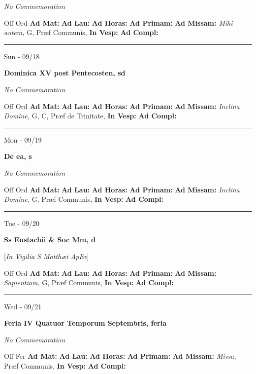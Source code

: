 \documentclass[letterpaper, 10pt]{article}
\begin{document}
\textit{No Commemoration}\begin{justify}
Off Ord
\textbf{Ad Mat: }
\textbf{Ad Lau: }
\textbf{Ad Horas: }
\textbf{Ad Primam: }
\textbf{Ad Missam:} \textit{Mihi autem, } G, Præf Communis, 
\textbf{In Vesp: }
\textbf{Ad Compl: }\end{justify}



\hrule
\begin{center}
Sun - 09/18
\end{center}\textbf{ \large Dominica XV post Pentecosten, \textnormal{\normalsize sd}}

\textit{No Commemoration}\begin{justify}
Off Ord
\textbf{Ad Mat: }
\textbf{Ad Lau: }
\textbf{Ad Horas: }
\textbf{Ad Primam: }
\textbf{Ad Missam:} \textit{Inclina Domine, } G, C, Præf de Trinitate, 
\textbf{In Vesp: }
\textbf{Ad Compl: }\end{justify}



\hrule
\begin{center}
Mon - 09/19
\end{center}\textbf{ \large De ea, \textnormal{\normalsize s}}

\textit{No Commemoration}\begin{justify}
Off Ord
\textbf{Ad Mat: }
\textbf{Ad Lau: }
\textbf{Ad Horas: }
\textbf{Ad Primam: }
\textbf{Ad Missam:} \textit{Inclina Domine, } G, Præf Communis, 
\textbf{In Vesp: }
\textbf{Ad Compl: }\end{justify}



\hrule
\begin{center}
Tue - 09/20
\end{center}\textbf{ \large Ss Eustachii \& Soc Mm, \textnormal{\normalsize d}}

[\textit{In Vigilia S Matthæi ApEv}]
\begin{justify}
Off Ord
\textbf{Ad Mat: }
\textbf{Ad Lau: }
\textbf{Ad Horas: }
\textbf{Ad Primam: }
\textbf{Ad Missam:} \textit{Sapientiam, } G, Præf Communis, 
\textbf{In Vesp: }
\textbf{Ad Compl: }\end{justify}



\hrule
\begin{center}
Wed - 09/21
\end{center}\textbf{ \large Feria IV Quatuor Temporum Septembris, \textnormal{\normalsize feria}}

\textit{No Commemoration}\begin{justify}
Off Fer
\textbf{Ad Mat: }
\textbf{Ad Lau: }
\textbf{Ad Horas: }
\textbf{Ad Primam: }
\textbf{Ad Missam:} \textit{Missa, } Præf Communis, 
\textbf{In Vesp: }
\textbf{Ad Compl: }\end{justify}
\end{document}
